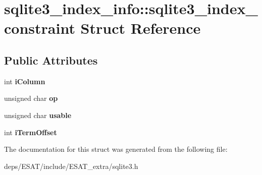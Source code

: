 \hypertarget{structsqlite3__index__info_1_1sqlite3__index__constraint}{}\section{sqlite3\+\_\+index\+\_\+info\+:\+:sqlite3\+\_\+index\+\_\+constraint Struct Reference}
\label{structsqlite3__index__info_1_1sqlite3__index__constraint}
\subsection*{Public Attributes}
\begin{DoxyCompactItemize}
\item 
\mbox{\label{structsqlite3__index__info_1_1sqlite3__index__constraint_a0f1e207060420058ee2881f2ea368e3a}} 
int {\bfseries i\+Column}
\item 
\mbox{\label{structsqlite3__index__info_1_1sqlite3__index__constraint_a362f4ec1f71975cb0ac39a8b5e4b1476}} 
unsigned char {\bfseries op}
\item 
\mbox{\label{structsqlite3__index__info_1_1sqlite3__index__constraint_ae16e62caeab743cc68bb22227dacb501}} 
unsigned char {\bfseries usable}
\item 
\mbox{\label{structsqlite3__index__info_1_1sqlite3__index__constraint_a4e8368da66f34b7f07b369984b813d1b}} 
int {\bfseries i\+Term\+Offset}
\end{DoxyCompactItemize}


The documentation for this struct was generated from the following file\+:\begin{DoxyCompactItemize}
\item 
deps/\+E\+S\+A\+T/include/\+E\+S\+A\+T\+\_\+extra/sqlite3.\+h\end{DoxyCompactItemize}
